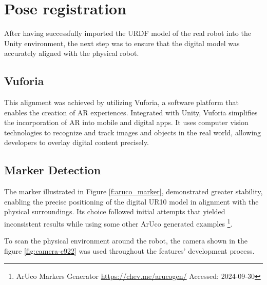 
\section{Pose registration}

After having successfully imported the \ac{URDF} model of the real robot into the Unity environment, the next step was to ensure that the digital model was accurately aligned with the physical robot. 

\subsection{Vuforia}
\label{section:marker-detection}

This alignment was achieved by utilizing Vuforia, a software platform that enables the creation of \ac{AR} experiences. Integrated with Unity, Vuforia simplifies the incorporation of \ac{AR} into mobile and digital apps. It uses computer vision technologies to recognize and track images and objects in the real world, allowing developers to overlay digital content precisely.

\subsection{Marker Detection}

The marker illustrated in Figure \ref{f:aruco_marker}, demonstrated greater stability, enabling the precise positioning of the digital UR10 model in alignment with the physical surroundings. Its choice followed initial attempts that yielded inconsistent results while using some other ArUco generated examples \footnote{ArUco Markers Generator \url{https://chev.me/arucogen/} Accessed: 2024-09-30}. 

To scan the physical environment around the robot, the camera shown in the figure \ref{fig:camera-c922} was used throughout the features' development process. 

